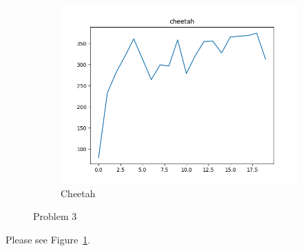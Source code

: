 \begin{figure}[htbp]
\begin{subfigure}[b]{0.3\linewidth}
        \includegraphics[width=1.0\linewidth]{figures/p3-ch.png}
        \caption{Cheetah}
    \end{subfigure}
    \caption{Problem 3}
    \label{fig:p3}
\end{figure}

Please see Figure~\ref{fig:p3}.